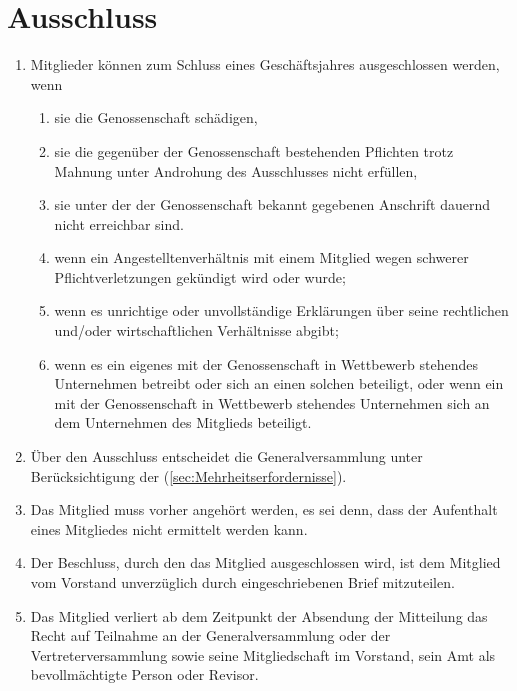 \documentclass[a4paper, 12pt]{scrartcl}
\begin{document}
\section{Ausschluss}
\begin{enumerate}
  \item Mitglieder können zum Schluss eines Geschäftsjahres ausgeschlossen werden, wenn
  \begin{enumerate}
    \item sie die Genossenschaft schädigen,
    \item sie die gegenüber der Genossenschaft bestehenden Pflichten trotz Mahnung unter Androhung des Ausschlusses nicht erfüllen,
    \item sie unter der der Genossenschaft bekannt gegebenen Anschrift dauernd nicht erreichbar sind.
    \item wenn ein Angestelltenverhältnis mit einem Mitglied wegen schwerer Pflichtverletzungen gekündigt wird oder wurde;
    \item wenn es unrichtige oder unvollständige Erklärungen über seine rechtlichen und/oder wirtschaftlichen Verhältnisse abgibt;
    \item wenn es ein eigenes mit der Genossenschaft in Wettbewerb stehendes Unternehmen betreibt oder sich an einen solchen beteiligt, oder wenn ein mit der Genossenschaft in Wettbewerb stehendes Unternehmen sich an dem Unternehmen des Mitglieds beteiligt.
  \end{enumerate}
  \item Über den Ausschluss entscheidet die Generalversammlung unter Berücksichtigung der  (\autoref{sec:Mehrheitserfordernisse}).
  \item Das Mitglied muss vorher angehört werden, es sei denn, dass der Aufenthalt eines Mitgliedes nicht ermittelt werden kann.
  \item Der Beschluss, durch den das Mitglied ausgeschlossen wird, ist dem Mitglied vom Vorstand unverzüglich durch eingeschriebenen Brief mitzuteilen.
  \item Das Mitglied verliert ab dem Zeitpunkt der Absendung der Mitteilung das Recht auf Teilnahme an der Generalversammlung oder der Vertreterversammlung sowie seine Mitgliedschaft im Vorstand, sein Amt als bevollmächtigte Person oder Revisor.
\end{enumerate}
\end{document}
